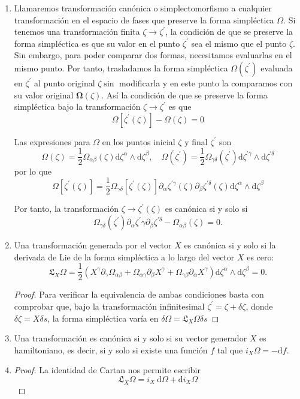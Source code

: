 \begin{enumerate}
  \item Llamaremos transformación canónica o simplectomorfismo a cualquier transformación en el espacio de fases que preserve la forma simpléctica $\Omega$. Si tenemos una transformación finita $\zeta \rightarrow \zeta^{\prime}$, la condición de que se preserve la forma simpléctica es que su valor en el punto $\zeta^{\prime}$ sea el mismo que el punto $\zeta$. Sin embargo, para poder comparar dos formas, necesitamos evaluarlas en el mismo punto. Por tanto, trasladamos la forma simpléctica $\Omega\left(\zeta^{\prime}\right)$ evaluada en $\zeta^{\prime}$ al punto original $\zeta \sin$ modificarla y en este punto la comparamos con su valor original $\boldsymbol{\Omega}(\zeta)$. Así la condición de que se preserve la forma simpléctica bajo la transformación $\zeta \rightarrow \zeta^{\prime}$ es que
  $$
  \Omega\left[\zeta^{\prime}(\zeta)\right]-\Omega(\zeta)=0
  $$
  
  Las expresiones para $\Omega$ en los puntos inicial $\zeta$ y final $\zeta^{\prime}$ son
  $$
  \Omega(\zeta)=\frac{1}{2} \Omega_{\alpha \beta}(\zeta) \mathrm{d} \zeta^{\alpha} \wedge \mathrm{d} \zeta^{\beta}, \quad \Omega\left(\zeta^{\prime}\right)=\frac{1}{2} \Omega_{\gamma \delta}\left(\zeta^{\prime}\right) \mathrm{d} \zeta^{\prime \gamma} \wedge \mathrm{d} \zeta^{\prime \delta}
  $$
  por lo que
  $$
  \Omega\left[\zeta^{\prime}(\zeta)\right]=\frac{1}{2} \Omega_{\gamma \delta}\left[\zeta^{\prime}(\zeta)\right] \partial_{\alpha} \zeta^{\prime \gamma}(\zeta) \partial_{\beta} \zeta^{\prime \delta}(\zeta) \mathrm{d} \zeta^{\alpha} \wedge \mathrm{d} \zeta^{\beta}
  $$
  
  Por tanto, la transformación $\zeta \rightarrow \zeta^{\prime}(\zeta)$ es canónica si y solo si
  $$
  \Omega_{\gamma \delta}\left(\zeta^{\prime}\right) \partial_{\alpha} \zeta^{\prime} \gamma \partial_{\beta} \zeta^{\prime \delta}-\Omega_{\alpha \beta}(\zeta)=0 .
  $$
  \item Una transformación generada por el vector $X$ es canónica si y solo si la derivada de Lie de la forma simpléctica a lo largo del vector $X$ es cero:
  $$
  \mathfrak{L}_{X} \Omega=\frac{1}{2}\left(X^{\gamma} \partial_{\gamma} \Omega_{\alpha \beta}+\Omega_{\alpha \gamma} \partial_{\beta} X^{\gamma}+\Omega_{\gamma \beta} \partial_{\alpha} X^{\gamma}\right) \mathrm{d} \zeta^{\alpha} \wedge \mathrm{d} \zeta^{\beta}=0 .
  $$
  \begin{proof}Para verificar la equivalencia de ambas condiciones basta con comprobar que, bajo la transformación infinitesimal $\zeta^{\prime}=\zeta+\delta \zeta$, donde $\delta \zeta=X \delta s$, la forma simpléctica varía en $\delta \Omega=\mathfrak{L}_{X} \Omega \delta s$
  \end{proof}
  \item Una transformación es canónica si y solo si su vector generador $X$ es hamiltoniano, es decir, si y solo si existe una función $f$ tal que $i_{X} \Omega=-\mathrm{d} f$.
  \item \begin{proof}
    La identidad de Cartan nos permite escribir
$$
\mathfrak{L}_{X} \Omega=i_{X} \mathrm{~d} \Omega+\mathrm{d} i_{X} \Omega
$$


\end{proof}
\end{enumerate}
